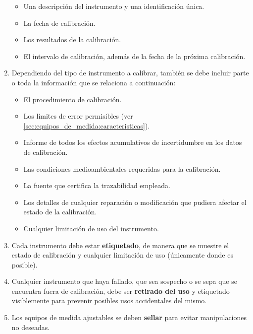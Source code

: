 \begin{enumerate}
	\begin{itemize}
		\item 
		Una descripción del instrumento y una identificación única.
		\item
		La fecha de calibración.
		\item
		Los resultados de la calibración.
		\item
		El intervalo de calibración, además de la fecha de la próxima  calibración.
	\end{itemize}

\item
Dependiendo del tipo de instrumento a calibrar, también se debe incluir parte o toda la información que se relaciona a continuación: 

	\begin{itemize}
	
		\item
		El procedimiento de calibración.
		\item
		Los límites de error permisibles (ver \autoref{sec:equipos_de_medida:caracteristicas}).
		\item
		Informe de todos los efectos acumulativos de incertidumbre en los datos de calibración.
		\item
		Las condiciones medioambientales requeridas para la calibración.
		\item
		La fuente que certifica la trazabilidad empleada.
		\item
		Los detalles de cualquier reparación o modificación que pudiera afectar el estado de la calibración.
		\item
		Cualquier limitación de uso del instrumento.
	
	\end{itemize}

\item
Cada instrumento debe estar \textbf{etiquetado}, de manera que se muestre el estado de calibración y cualquier limitación de uso (únicamente donde es posible).

\item
Cualquier instrumento que haya fallado, que sea sospecho o se sepa que se encuentra fuera de calibración, debe ser \textbf{retirado del uso} y etiquetado visiblemente para prevenir posibles usos accidentales del mismo.

\item
Los equipos de medida ajustables se deben \textbf{sellar} para evitar manipulaciones no deseadas.

\end{enumerate}

